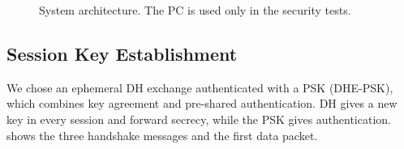 \documentclass[11pt,a4paper]{article}
\begin{document}
\begin{figure}[H]
    \caption{System architecture. The PC is used only in the security tests.}
    \label{fig:architecture}
\end{figure}

\subsection{Session Key Establishment}
\label{sec:handshake}

We chose an ephemeral DH exchange authenticated with a PSK (DHE-PSK), which
combines key agreement and pre-shared authentication. DH gives a new key in every
session and forward secrecy, while the PSK gives authentication.
 shows the three handshake messages and the first data
packet.
\end{document}
